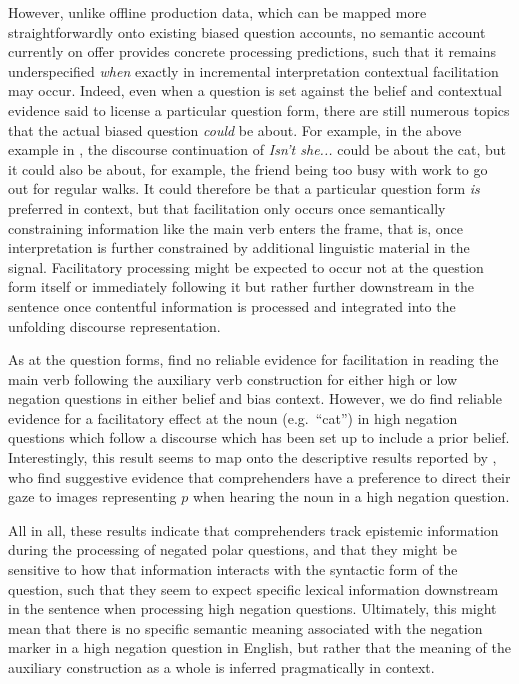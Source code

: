 \documentclass[output=paper,colorlinks,citecolor=brown]{langscibook}
\begin{document}
However, unlike offline production data, which can be mapped more straightforwardly onto existing biased question accounts, no semantic account currently on offer provides concrete processing predictions, such that it remains underspecified \textit{when} exactly in incremental interpretation contextual facilitation may occur. Indeed, even when a question is set against the belief and contextual evidence said to license a particular question form, there are still numerous topics that the actual biased question \textit{could} be about. For example, in the above example in , the discourse continuation of \textit{Isn't she...} could be about the cat, but it could also be about, for example, the friend being too busy with work to go out for regular walks. It could therefore be that a particular question form \textit{is} preferred in context, but that facilitation only occurs once semantically constraining information like the main verb enters the frame, that is, once interpretation is further constrained by additional linguistic material in the signal. Facilitatory processing might be expected to occur not at the question form itself or immediately following it but rather further downstream in the sentence once contentful information is processed and integrated into the unfolding discourse representation.

As at the question forms, \citet{macuch_processing_inprep} find no reliable evidence for facilitation in reading the main verb following the auxiliary verb construction for either high or low negation questions in either belief and bias context. However, we do find reliable evidence for a facilitatory effect at the noun (e.g.\ ``cat'') in high negation questions which follow a discourse which has been set up to include a prior belief. Interestingly, this result seems to map onto the descriptive results reported by \citet{tian_representing_2021}, who find suggestive evidence that comprehenders have a preference to direct their gaze to images representing $p$ when hearing the noun in a high negation question.

All in all, these results indicate that comprehenders track epistemic information during the processing of negated polar questions, and that they might be sensitive to how that information interacts with the syntactic form of the question, such that they seem to expect specific lexical information downstream in the sentence when processing high negation questions. Ultimately, this might mean that there is no specific semantic meaning associated with the negation marker in a high negation question in English, but rather that the meaning of the auxiliary construction as a whole is inferred pragmatically in context.
\end{document}
